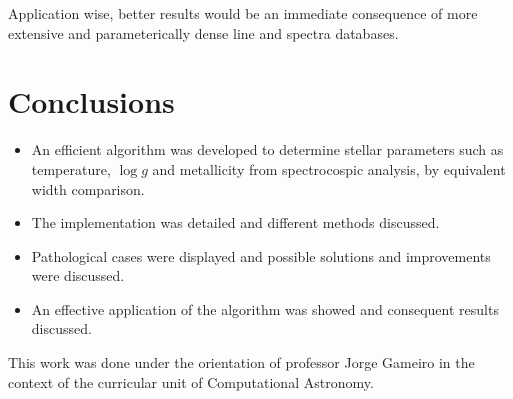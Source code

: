 \documentclass{aa}
\begin{document}
Application wise, better results would be an immediate consequence of more
extensive and parameterically dense line and spectra databases.

\section{Conclusions}

\begin{itemize}
\item An efficient algorithm was developed to determine stellar
  parameters such as temperature, $\log g$ and metallicity from spectrocospic
  analysis, by equivalent width comparison.
\item The implementation was detailed and different methods discussed.
\item Pathological cases were displayed and possible solutions and improvements were discussed.
\item An effective application of the algorithm was showed and consequent
  results discussed.
\end{itemize}

\begin{acknowledgements}
  This work was done under the orientation of professor Jorge Gameiro in the
  context of the curricular unit of Computational Astronomy.
\end{acknowledgements}



\end{document}
